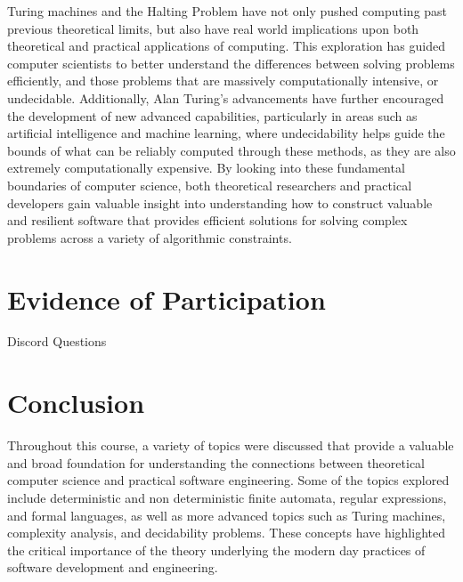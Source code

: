 \documentclass{article}
\theoremstyle{theorem}
\theoremstyle{definition}
\theoremstyle{remark}
\begin{document}
Turing machines and the Halting Problem have not only pushed computing past previous theoretical limits, but also have real world implications upon both theoretical and practical applications of computing. This exploration has guided computer scientists to better understand the differences between solving problems efficiently, and those problems that are massively computationally intensive, or undecidable. Additionally, Alan Turing’s advancements have further encouraged the development of new advanced capabilities, particularly in areas such as artificial intelligence and machine learning, where undecidability helps guide the bounds of what can be reliably computed through these methods, as they are also extremely computationally expensive. By looking into these fundamental boundaries of computer science, both theoretical researchers and practical developers gain valuable insight into understanding how to construct valuable and resilient software that provides efficient solutions for solving complex problems across a variety of algorithmic constraints. 

\section{Evidence of Participation}

Discord Questions

\newpage
\section{Conclusion}\label{conclusion}

Throughout this course, a variety of topics were discussed that provide a valuable and broad foundation for understanding the connections between theoretical computer science and practical software engineering. Some of the topics explored include deterministic and non deterministic finite automata, regular expressions, and formal languages, as well as more advanced topics such as Turing machines, complexity analysis, and decidability problems. These concepts have highlighted the critical importance of the theory underlying the modern day practices of software development and engineering.
\end{document}
